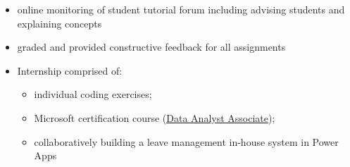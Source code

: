 \documentclass[10pt,a4paper]{altacv}
\begin{document}
\divider



\begin{itemize}
\item online monitoring of student tutorial forum including advising students and explaining concepts
\item graded and provided constructive feedback for all assignments
\end{itemize}

\divider

\begin{itemize}
\item Internship comprised of:
\begin{itemize}
    \item individual coding exercises;
    \item Microsoft certification course (\href{https://docs.microsoft.com/en-us/learn/certifications/data-analyst-associate/}{\underline{Data Analyst Associate}});
    \item collaboratively building a leave management in-house system in Power Apps
\end{itemize} 
\end{itemize}

\divider

\clearpage



\end{document}
